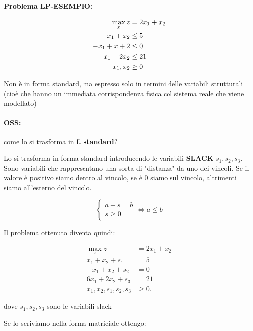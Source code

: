 \documentclass[a4paper, 11pt]{article}
\begin{document}
        \textbf{Problema LP-ESEMPIO: }

        \begin{align}
            \max_{x} z &= 2x_1+x_2 \notag \\
            x_1 + x_2 &\leq 5 \notag \\
            -x_1 + x+2 &\leq 0 \notag \\
            x_1 + 2x_2 &\leq 21 \notag \\
            x_1, x_2 &\geq 0 \notag 
        \end{align}

        Non è in forma standard, ma espresso solo in termini delle variabili strutturali (cioè che hanno un immediata corrispondenza
        fisica col sistema reale che viene modellato)

        \paragraph{OSS: } come lo si trasforma in \textbf{f. standard}? 

        Lo si trasforma in forma standard introducendo le variabili \textbf{SLACK} $s_1, s_2, s_3$. Sono variabili che rappresentano una sorta di "distanza" da uno dei vincoli. Se il valore è positivo siamo dentro al vincolo, se è 0 siamo sul vincolo, altrimenti siamo all'esterno del vincolo.

        \[
            \begin{cases}
                a+s = b \\
                s \geq 0
            \end{cases}
            \iff a \leq b 
        \]            
        
        Il problema ottenuto diventa quindi:

        \begin{align*}
            \max_{x} z &= 2x_1 + x_2 \\
            x_1 + x_2 + s_1 &= 5 \\
            -x_1 + x_2 + s_2 &= 0 \\
            6x_1 + 2x_2 + s_3 &= 21 \\
            x_1, x_2, s_1, s_2, s_3 &\geq 0.
        \end{align*}

        dove $s_1, s_2, s_3$ sono le variabili slack

        Se lo scriviamo nella forma matriciale ottengo:
\end{document}
